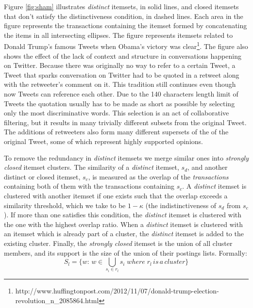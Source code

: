 \documentclass{sig-alternate}
\begin{document}
Figure \ref{fig:sham} illustrates \emph{distinct} itemsets, in solid lines, and closed itemsets that don't satisfy the distinctiveness condition, in dashed lines. Each area in the figure represents the transactions containing the itemset formed by concatenating the items in all intersecting ellipses.  
The figure represents itemsets related to Donald Trump's famous 
Tweets when Obama's victory was clear\footnote{http://www.huffingtonpost.com/2012/11/07/donald-trump-election-revolution\_n\_2085864.html}.  
The figure also shows the effect of the lack of context and structure in conversations happening on Twitter. Because there was originally no way to refer to a certain Tweet, a Tweet that sparks conversation on Twitter had  to be quoted in a retweet along with the retweeter's comment on it. This tradition still continues even though now Tweets can reference each other. 
Due to the 140 characters length limit of Tweets the quotation usually has to be made as short as possible by selecting only the most discriminative words. This selection is an act of collaborative filtering, but it results in many trivially different subsets from the original Tweet. The additions of retweeters also form many different supersets of the of the original Tweet, some of which represent highly supported opinions. 

To remove the redundancy in \emph{distinct} itemsets we merge similar ones into \emph{strongly closed} itemset clusters. The similarity of a \emph{distinct} itemset, $s_d$, and another distinct or closed itemset, $s_c$, is measured as the overlap of the \emph{transactions} containing both of them with the transactions containing $s_c$.  A \emph{distinct} itemset is clustered with another itemset if one exists such that the overlap exceeds a similarity threshold, which we take to be $1-\kappa$ (the indistinctiveness of $s_d$ from $s_c$).
If more than one satisfies this condition, the  \emph{distinct} itemset is clustered with the one with the highest overlap ratio. When  a \emph{distinct} itemset is clustered with an itemset which is already part of a cluster, the \emph{distinct} itemset is added to the existing cluster. Finally, the \emph{strongly closed} itemset is the 
union of all cluster members, and its support is the size of the union of their postings lists. Formally:
\begin{equation}S_l = \{w:\, w \in \bigcup_{s_i \in r_l}{s_i} \; where \; r_l \, is \, a\, cluster\}\end{equation}
\end{document}
